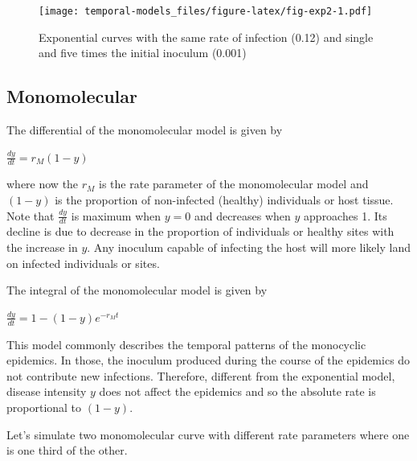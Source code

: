 \documentclass[
  letterpaper,
]{book}
\begin{document}
\begin{figure}

\texttt{[image: temporal-models\_files/figure-latex/fig-exp2-1.pdf]} \hfill{}

\caption{\label{fig-exp2}Exponential curves with the same rate of
infection (0.12) and single and five times the initial inoculum (0.001)}

\end{figure}

\hypertarget{monomolecular}{%
\subsection{Monomolecular}\label{monomolecular}}

The differential of the monomolecular model is given by

\(\frac{dy}{dt} = r_M (1-y)\)

where now the \(r_M\) is the rate parameter of the monomolecular model
and \((1-y)\) is the proportion of non-infected (healthy) individuals or
host tissue. Note that \(\frac{dy}{dt}\) is maximum when \(y = 0\) and
decreases when \(y\) approaches 1. Its decline is due to decrease in the
proportion of individuals or healthy sites with the increase in \(y\).
Any inoculum capable of infecting the host will more likely land on
infected individuals or sites.

The integral of the monomolecular model is given by

\(\frac{dy}{dt} = 1 - (1-y)e^{-r_Mt}\)

This model commonly describes the temporal patterns of the monocyclic
epidemics. In those, the inoculum produced during the course of the
epidemics do not contribute new infections. Therefore, different from
the exponential model, disease intensity \(y\) does not affect the
epidemics and so the absolute rate is proportional to \((1-y)\).

Let's simulate two monomolecular curve with different rate parameters
where one is one third of the other.
\end{document}
